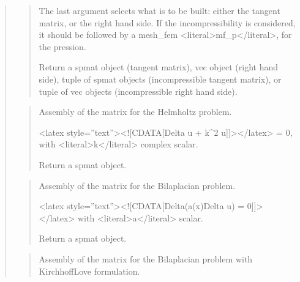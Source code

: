 \documentclass[a4paper,11pt,english]{sphinxmanual}
\begin{document}
\begin{quote}
\begin{quote}
\sphinxAtStartPar
The last argument selects what is to be built: either the tangent
matrix, or the right hand side. If the incompressibility is
considered, it should be followed by a mesh\_fem \textless{}literal\textgreater{}mf\_p\textless{}/literal\textgreater{}, for the
pression.

\sphinxAtStartPar
Return a spmat object (tangent matrix), vec object (right hand
side), tuple of spmat objects (incompressible tangent matrix), or
tuple of vec objects (incompressible right hand side).
\end{quote}

\sphinxAtStartPar
{}
\begin{quote}

\sphinxAtStartPar
Assembly of the matrix for the Helmholtz problem.

\sphinxAtStartPar
\textless{}latex style=”text”\textgreater{}\textless{}!{[}CDATA{[}Delta u + k\textasciicircum{}2 u{]}{]}\textgreater{}\textless{}/latex\textgreater{} = 0,  with \textless{}literal\textgreater{}k\textless{}/literal\textgreater{} complex scalar.

\sphinxAtStartPar
Return a spmat object.
\end{quote}

\sphinxAtStartPar
{}
\begin{quote}

\sphinxAtStartPar
Assembly of the matrix for the Bilaplacian problem.

\sphinxAtStartPar
\textless{}latex style=”text”\textgreater{}\textless{}!{[}CDATA{[}Delta(a(x)Delta u) = 0{]}{]}\textgreater{}\textless{}/latex\textgreater{}   with \textless{}literal\textgreater{}a\textless{}/literal\textgreater{} scalar.

\sphinxAtStartPar
Return a spmat object.
\end{quote}

\sphinxAtStartPar
{}
\begin{quote}

\sphinxAtStartPar
Assembly of the matrix for the Bilaplacian problem with Kirchhoff\sphinxhyphen{}Love formulation.


\end{quote}
\end{quote}
\end{document}
